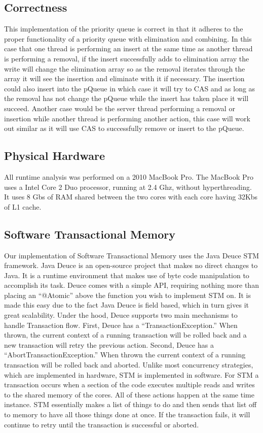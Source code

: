 \documentclass[10pt]{asme2ej}
\begin{document}
\subsection{Correctness}
This implementation of the priority queue is correct in that it adheres to the proper functionality of a priority queue with elimination and combining. In this case that one thread is performing an insert at the same time as another thread is performing a removal, if the insert successfully adds to elimination array the write will change the elimination array so as the removal iterates through the array it will see the insertion and eliminate with it if necessary. The insertion could also insert into the pQueue in which case it will try to CAS and as long as the removal has not change the pQueue while the insert has taken place it will succeed. Another case would be the server thread performing a removal or insertion while another thread is performing another action, this case will work out similar as it will use CAS to successfully remove or insert to the pQueue.

\subsection{Physical Hardware}
All runtime analysis was performed on a 2010 MacBook Pro. The MacBook Pro uses a Intel Core 2 Duo processor, running at 2.4 Ghz, without hyperthreading. It uses 8 Gbs of RAM shared between the two cores with each core having 32Kbs of L1 cache.

\subsection{Software Transactional Memory}
Our implementation of Software Transactional Memory uses the Java Deuce STM framework. Java Deuce is an open-source project that makes no direct changes to Java. It is a runtime environment that makes use of byte code manipulation to accomplish its task. Deuce comes with a simple API, requiring nothing more than placing an “@Atomic” above the function you wish to implement STM on. It is made this easy due to the fact Java Deuce is field based, which in turn gives it great scalability. Under the hood, Deuce supports two main mechanisms to handle Transaction flow. First, Deuce has a “TransactionException.” When thrown, the current context of a running transaction will be rolled back and a new transaction will retry the previous action. Second, Deuce has a “AbortTransactionException.” When thrown the current context of a running transaction will be rolled back and aborted. Unlike most concurrency strategies, which are implemented in hardware, STM is implemented in software. For STM a transaction occurs when a section of the code executes multiple reads and writes to the shared memory of the cores. All of these actions happen at the same time instance. STM essentially makes a list of things to do and then sends that list off to memory to have all those things done at once. If the transaction fails, it will continue to retry until the transaction is successful or aborted.
\end{document}
